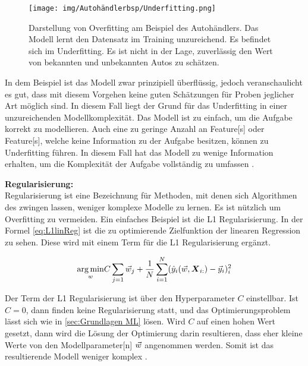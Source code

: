 \begin{figure}[htb]
    \centering
    \texttt{[image: img/Autohändlerbsp/Underfitting.png]}
    \caption[Darstellung von Underfitting am Beispiel des Autohändlers.]{Darstellung von Overfitting am Beispiel des Autohändlers. Das Modell lernt den Datensatz im Training unzureichend. Es befindet sich im Underfitting. Es ist nicht in der Lage, zuverlässig den Wert von bekannten und unbekannten Autos zu schätzen.}
    \label{fig:BspUnderfitting}
\end{figure}

In dem Beispiel ist das Modell zwar prinzipiell überflüssig, jedoch veranschaulicht es gut, dass mit diesem Vorgehen keine guten Schätzungen für Proben jeglicher Art möglich sind. In diesem Fall liegt der Grund für das \gls{Underfitting} in einer unzureichenden Modellkomplexität. Das Modell ist zu einfach, um die Aufgabe korrekt zu modellieren. Auch eine zu geringe Anzahl an \gls{Feature}[s] oder \gls{Feature}[s], welche keine Information zu der Aufgabe besitzen, können zu \gls{Underfitting} führen. In diesem Fall hat das Modell zu wenige Information erhalten, um die Komplexität der Aufgabe vollständig zu umfassen \cite{Burkov.2019, Bishop.2006, Goodfellow.2016}.  \dubpar

\textbf{\gls{Regularisierung}:}\\
\gls{Regularisierung} ist eine Bezeichnung für Methoden, mit denen sich Algorithmen des  zwingen lassen, weniger komplexe Modelle zu lernen. Es ist nützlich um \gls{Overfitting} zu vermeiden. Ein einfaches Beispiel ist die L1 \gls{Regularisierung}. In der Formel \ref{eq:L1linReg} ist die zu optimierende \gls{Zielfunktion} der linearen Regression zu sehen. Diese wird mit einem Term für die L1 \gls{Regularisierung} ergänzt.

\begin{equation}
    \label{eq:L1linReg}
    \underset{w}{\arg\min} C\sum_{j=1}\vec{w}_j + \frac{1}{N} \sum_{i=1}^{N} (\hat{y}_i(\vec{w}, \boldsymbol{X}_{i:}) - \vec{y}_i)_i^2
\end{equation}

Der Term der L1 \gls{Regularisierung} ist über den \gls{Hyperparameter} \(C\) einstellbar. Ist \(C=0\), dann finden keine \gls{Regularisierung} statt, und das Optimierungsproblem lässt sich wie in \ref{sec:Grundlagen ML} lösen. Wird \(C\) auf einen hohen Wert gesetzt, dann wird die Lösung der Optimierung darin resultieren, dass eher kleine Werte von den  \gls{Modellparameter}[n] \(\vec{w}\) angenommen werden. Somit ist das resultierende Modell weniger komplex \cite{Burkov.2019}. \dubpar


